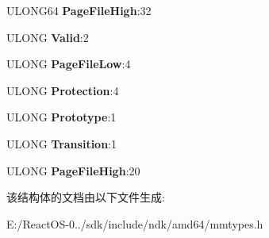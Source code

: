 \begin{DoxyCompactItemize}
U\+L\+O\+N\+G64 {\bfseries Page\+File\+High}\+:32
\item 
\mbox{\label{struct___m_m_p_t_e___s_o_f_t_w_a_r_e_a2c14b16b6fc4b3db172eb50adb116cbb}} 
U\+L\+O\+NG {\bfseries Valid}\+:2
\item 
\mbox{\label{struct___m_m_p_t_e___s_o_f_t_w_a_r_e_affc821816a9245bb1bfd3f2e609ad635}} 
U\+L\+O\+NG {\bfseries Page\+File\+Low}\+:4
\item 
\mbox{\label{struct___m_m_p_t_e___s_o_f_t_w_a_r_e_a965728ea251de32af5ef234928eeafd1}} 
U\+L\+O\+NG {\bfseries Protection}\+:4
\item 
\mbox{\label{struct___m_m_p_t_e___s_o_f_t_w_a_r_e_a9de76d03aeb2fa601bf15882c3f5d170}} 
U\+L\+O\+NG {\bfseries Prototype}\+:1
\item 
\mbox{\label{struct___m_m_p_t_e___s_o_f_t_w_a_r_e_a7127e997d8b491cb8224feaf1759735d}} 
U\+L\+O\+NG {\bfseries Transition}\+:1
\item 
\mbox{\label{struct___m_m_p_t_e___s_o_f_t_w_a_r_e_ac3e4af3e9790f8d7cb80566f6caf448c}} 
U\+L\+O\+NG {\bfseries Page\+File\+High}\+:20
\end{DoxyCompactItemize}


该结构体的文档由以下文件生成\+:\begin{DoxyCompactItemize}
\item 
E\+:/\+React\+O\+S-\/0../sdk/include/ndk/amd64/mmtypes.\+h\end{DoxyCompactItemize}
